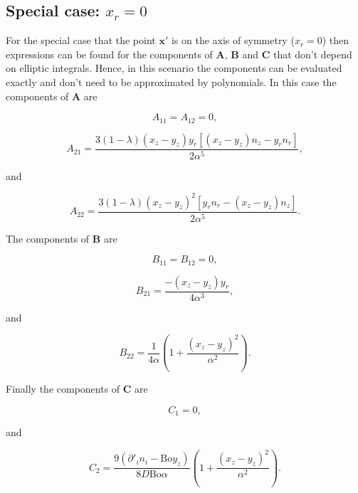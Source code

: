 \documentclass[12pt]{article}
\begin{document}
\subsection{Special case: $x_{r} = 0$}
\label{subapp:spec_case}

For the special case that the point $\boldsymbol{x'}$ is on the axis of symmetry ($x_{r} = 0$) then expressions can be found for the components of $\boldsymbol{A}$, $\boldsymbol{B}$ and $\boldsymbol{C}$ that don't depend on elliptic integrals. Hence, in this scenario the components can be evaluated exactly and don't need to be approximated by polynomials. In this case the components of $\boldsymbol{A}$ are

\begin{equation}
\label{equ:A11_spec}
A_{11} = A_{12} = 0,
\end{equation}

\begin{equation}
\label{equ:A21_spec}
A_{21} = \frac{3 (1 - \lambda) (x_{z} - y_{z}) y_{r} [(x_{z} - y_{z}) n_{z} - y_{r} n_{r}]}{2 \alpha^{5}},
\end{equation}

and

\begin{equation}
\label{equ:A22_spec}
A_{22} = \frac{3 (1 - \lambda) (x_{z} - y_{z})^{2} [y_{r} n_{r} - (x_{z} - y_{z}) n_{z}]}{2 \alpha^{5}}.
\end{equation}

The components of $\boldsymbol{B}$ are

\begin{equation}
\label{equ:B11_spec}
B_{11} = B_{12} = 0,
\end{equation}

\begin{equation}
\label{equ:B21_spec}
B_{21} = \frac{-(x_{z} - y_{z}) y_{r}}{4 \alpha^{3}},
\end{equation}

and

\begin{equation}
\label{equ:B22_spec}
B_{22} = \frac{1}{4 \alpha} \left(1 + \frac{(x_{z} - y_{z})^{2}}{\alpha^{2}} \right).
\end{equation}

Finally the components of $\boldsymbol{C}$ are

\begin{equation}
\label{equ:C1_spec}
C_{1} = 0 ,
\end{equation}

and

\begin{equation}
\label{equ:C2_spec}
C_{2} = \frac{9 (\partial'_{i} n_{i} - \text{Bo} y_{z})}{8 D \text{Bo} \alpha} \left(1 + \frac{(x_{z} - y_{z})^{2}}{\alpha^{2}} \right).
\end{equation}




\end{document}
